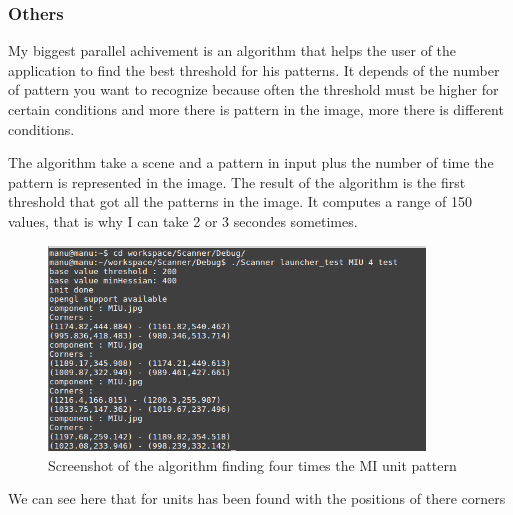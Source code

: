 	\subsubsection{Others}
	
	\par My biggest parallel achivement is an algorithm that helps the user of the application to find the best threshold for his patterns. It depends of the number of pattern you want to recognize because often the threshold must be higher for certain conditions and more there is pattern in the image, more there is different conditions. 
	\par The algorithm take a scene and a pattern in input plus the number of time the pattern is represented in the image. The result of the algorithm is the first threshold that got all the patterns in the image. It computes a range of 150 values, that is why I can take 2 or 3 secondes sometimes.
	
	\begin{figure}[h]
		\begin{center}
			\includegraphics[width=10cm]{images_not_compressed/tester.png}
			\caption{Screenshot of the algorithm finding four times the MI unit pattern}
		\end{center}
	\end{figure}	
	
	\par We can see here that for units has been found with the positions of there corners
	
